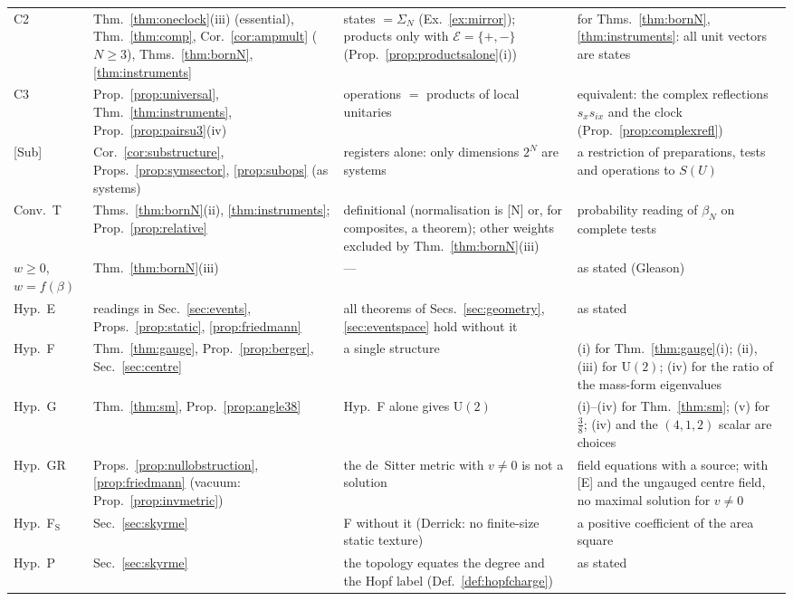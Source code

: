 \documentclass[aps,pra,onecolumn,superscriptaddress,nofootinbib,10pt]{revtex4-2}
\theoremstyle{definition}
\theoremstyle{remark}
\newcommand{\U}{\mathrm{U}}
\begin{document}
\begin{table}[h]
\begin{tabular}{@{}p{}p{}p{}p{}@{}}
C2 & Thm.~\ref{thm:oneclock}(iii) (essential), Thm.~\ref{thm:comp}, Cor.~\ref{cor:ampmult} ($N\ge3$), Thms.~\ref{thm:bornN}, \ref{thm:instruments} & states $=\Sigma_N$ (Ex.~\ref{ex:mirror}); products only with $\mathcal E=\{+,-\}$ (Prop.~\ref{prop:productsalone}(i)) & for Thms.~\ref{thm:bornN}, \ref{thm:instruments}: all unit vectors are states\\
C3 & Prop.~\ref{prop:universal}, Thm.~\ref{thm:instruments}, Prop.~\ref{prop:pairsu3}(iv) & operations $=$ products of local unitaries & equivalent: the complex reflections $s_xs_{ix}$ and the clock (Prop.~\ref{prop:complexrefl})\\
{[Sub]} & Cor.~\ref{cor:substructure}, Props.~\ref{prop:symsector}, \ref{prop:subops} (as systems) & registers alone: only dimensions $2^N$ are systems & a restriction of preparations, tests and operations to $S(U)$\\
Conv.\ T & Thms.~\ref{thm:bornN}(ii), \ref{thm:instruments}; Prop.~\ref{prop:relative} & definitional (normalisation is [N] or, for composites, a theorem); other weights excluded by Thm.~\ref{thm:bornN}(iii) & probability reading of $\beta_N$ on complete tests\\
$w\ge0$, $w=f(\beta)$ & Thm.~\ref{thm:bornN}(iii) & --- & as stated (Gleason)\\
Hyp.\ E & readings in Sec.~\ref{sec:events}, Props.~\ref{prop:static}, \ref{prop:friedmann} & all theorems of Secs.~\ref{sec:geometry}, \ref{sec:eventspace} hold without it & as stated\\
Hyp.\ F & Thm.~\ref{thm:gauge}, Prop.~\ref{prop:berger}, Sec.~\ref{sec:centre} & a single structure & (i) for Thm.~\ref{thm:gauge}(i); (ii), (iii) for $\U(2)$; (iv) for the ratio of the mass-form eigenvalues\\
Hyp.\ G & Thm.~\ref{thm:sm}, Prop.~\ref{prop:angle38} & Hyp.~F alone gives $\U(2)$ & (i)--(iv) for Thm.~\ref{thm:sm}; (v) for $\tfrac38$; (iv) and the $(4,1,2)$ scalar are choices\\
Hyp.\ GR & Props.~\ref{prop:nullobstruction}, \ref{prop:friedmann} (vacuum: Prop.~\ref{prop:invmetric}) & the de~Sitter metric with $v\ne0$ is not a solution & field equations with a source; with [E] and the ungauged centre field, no maximal solution for $v\ne0$\\
Hyp.\ F$_{\mathrm S}$ & Sec.~\ref{sec:skyrme} & F without it (Derrick: no finite-size static texture) & a positive coefficient of the area square\\
Hyp.\ P & Sec.~\ref{sec:skyrme} & the topology equates the degree and the Hopf label (Def.~\ref{def:hopfcharge}) & as stated\\

\end{tabular}
\end{table}
\end{document}
